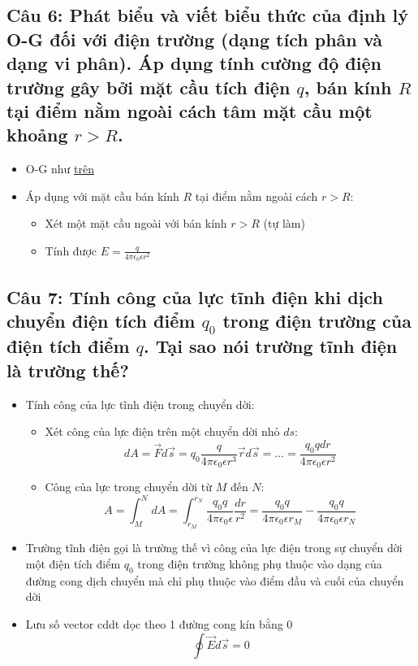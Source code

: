 \subsection[Câu 6]{Câu 6: Phát biểu và viết biểu thức của định lý O-G đối với điện trường (dạng tích phân và dạng vi phân). Áp dụng tính cường độ điện trường gây bởi mặt cầu tích điện $q$, bán kính $R$ tại điểm nằm ngoài cách tâm mặt cầu một khoảng $r > R$.}

\begin{itemize}
  \item O-G như \hyperref[def:o-g]{trên}
  \item Áp dụng với mặt cầu bán kính $R$ tại điểm nằm ngoài cách $r > R$:
  \begin{itemize}
    \item Xét một mặt cầu ngoài với bán kính $r > R$ (tự làm)
    \item Tính được $E = \frac{q}{4\pi\epsilon_0\epsilon r^2}$
  \end{itemize}
\end{itemize}

\subsection[Câu 7]{Câu 7: Tính công của lực tĩnh điện khi dịch chuyển điện tích điểm $q_0$ trong điện trường của điện tích điểm $q$. Tại sao nói trường tĩnh điện là trường thế?}

\begin{itemize}
  \item Tính công của lực tĩnh điện trong chuyển dời:
  \begin{itemize}
    \item Xét công của lực điện trên một chuyển dời nhỏ $ds$:
    \begin{equation*}
      dA = \vec{F}d\vec{s} = q_0 \frac{q}{4\pi\epsilon_0\epsilon r^3} \vec{r}d\vec{s} = \dots = \frac{q_0qdr}{4\pi\epsilon_0\epsilon r^2}
    \end{equation*}
    \item Công của lực trong chuyển dời từ $M$ đến $N$:
    \begin{equation*}
      A = \int_{M}^{N} dA = \int_{r_M}^{r_N} \frac{q_0q}{4\pi\epsilon_0\epsilon} \frac{dr}{r^2} = \frac{q_0q}{4\pi\epsilon_0\epsilon r_M} - \frac{q_0q}{4\pi\epsilon_0\epsilon r_N}
    \end{equation*}
  \end{itemize}
  \item Trường tĩnh điện gọi là trường thế vì công của lực điện trong sự chuyển dời một điện tích điểm $q_0$ trong điện trường không phụ thuộc vào dạng của đường cong dịch chuyển mà chỉ phụ thuộc vào điểm đầu và cuối của chuyển dời
  \item Lưu số vector cddt dọc theo 1 đường cong kín bằng 0
  \begin{equation*}
    \oint \vec{E}d\vec{s} = 0
  \end{equation*}
\end{itemize}

